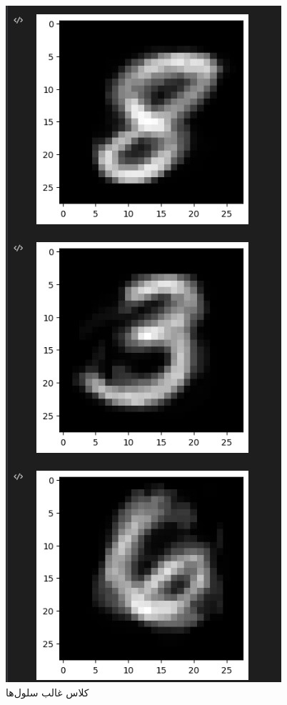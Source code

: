 \documentclass{article}
\begin{document}
\begin{figure}[!h]
    \centering\includegraphics[scale=.65]{./p6-5}
    \caption{کلاس غالب سلول‌ها}\label{fig.65}
\end{figure}
\end{document}
